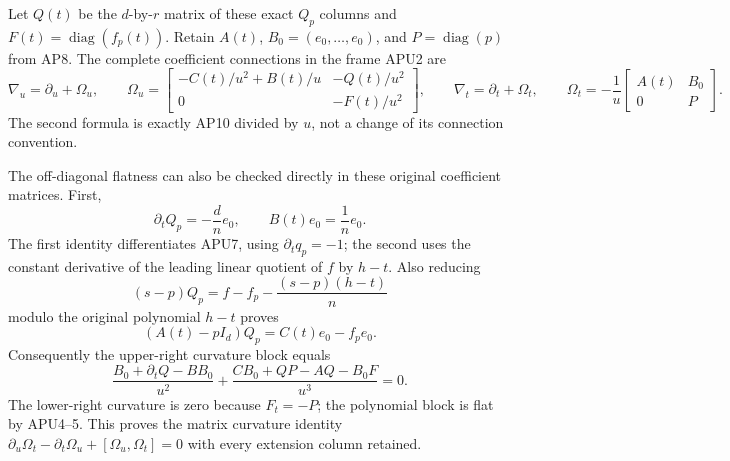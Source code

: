 Let \(Q(t)\) be the \(d\)-by-\(r\) matrix of these exact \(Q_p\)
columns and \(F(t)=\operatorname{diag}(f_p(t))\).
Retain \(A(t)\), \(B_0=(e_0,\ldots,e_0)\), and
\(P=\operatorname{diag}(p)\) from AP8.  The complete coefficient
connections in the frame APU2 are
\[
 \boxed{\displaystyle
 \nabla_u=\partial_u+\Omega_u,\qquad
 \Omega_u=
 \begin{bmatrix}
 -C(t)/u^2+B(t)/u&-Q(t)/u^2\\
 0&-F(t)/u^2
 \end{bmatrix},\qquad
 \nabla_t=\partial_t+\Omega_t,\qquad
 \Omega_t=-\frac1u
 \begin{bmatrix}A(t)&B_0\\0&P\end{bmatrix}.}
 \tag{APU9}
\]
The second formula is exactly AP10 divided by \(u\), not a change
of its connection convention.

The off-diagonal flatness can also be checked directly in these
original coefficient matrices.  First,
\[
 \partial_tQ_p=-\frac{d}{n}e_0,\qquad
 B(t)e_0=\frac1n e_0.
\]
The first identity differentiates APU7, using
\(\partial_tq_p=-1\); the second uses the constant derivative
of the leading linear quotient of \(f\) by \(h-t\).
Also reducing
\[
 (s-p)Q_p=f-f_p-\frac{(s-p)(h-t)}n
\]
modulo the original polynomial \(h-t\) proves
\[
 (A(t)-pI_d)Q_p=C(t)e_0-f_pe_0.
 \tag{APU10}
\]
Consequently the upper-right curvature block equals
\[
 \frac{B_0+\partial_tQ-BB_0}{u^2}
 +\frac{CB_0+QP-AQ-B_0F}{u^3}=0.
\]
The lower-right curvature is zero because \(F_t=-P\);
the polynomial block is flat by APU4--5.  This proves the matrix
curvature identity
\(\partial_u\Omega_t-\partial_t\Omega_u+
[\Omega_u,\Omega_t]=0\) with every extension column retained.


